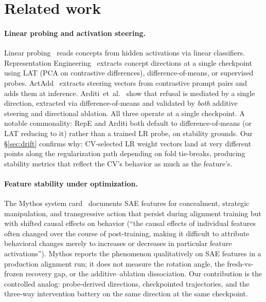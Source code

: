 \documentclass[11pt]{article}
\begin{document}
\section{Related work}
\label{sec:related}

\paragraph{Linear probing and activation steering.} Linear
probing~\citep{alain2016probe,hewitt2019structural} reads concepts from
hidden activations via linear classifiers. Representation
Engineering~\citep{zou2023representation} extracts concept directions at
a single checkpoint using LAT (PCA on contrastive differences),
difference-of-means, or supervised probes. ActAdd~\citep{turner2023activation}
extracts steering vectors from contrastive prompt pairs and adds them
at inference. Arditi~et~al.~\citep{arditi2024refusal} show that refusal
is mediated by a single direction, extracted via difference-of-means
and validated by \emph{both} additive steering and directional
ablation. All three operate at a single checkpoint. A notable
commonality: RepE and Arditi both default to difference-of-means (or
LAT reducing to it) rather than a trained LR probe, on stability
grounds. Our §\ref{sec:drift} confirms why: CV-selected LR weight
vectors land at very different points along the regularization path
depending on fold tie-breaks, producing stability metrics that reflect
the CV's behavior as much as the feature's.

\paragraph{Feature stability under optimization.} The Mythos system
card~\citep{anthropic2026mythos} documents SAE features for
concealment, strategic manipulation, and transgressive action that
persist during alignment training but with shifted causal effects on
behavior (``the causal effects of individual features often changed
over the course of post-training, making it difficult to attribute
behavioral changes merely to increases or decreases in particular
feature activations''). Mythos reports the phenomenon qualitatively on
SAE features in a production alignment run; it does not measure the
rotation angle, the fresh-vs-frozen recovery gap, or the
additive--ablation dissociation. Our contribution is the controlled
analog: probe-derived directions, checkpointed trajectories, and the
three-way intervention battery on the same direction at the same
checkpoint.
\end{document}
